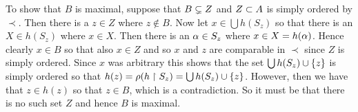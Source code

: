{{    To show that $B$ is maximal, suppose that $B \pss Z$ and $Z \ss A$ is simply ordered by $\prec$.
    Then there is a $z \in Z$ where $z \notin B$.
    Now let $x \in \bigcup h(S_z)$ so that there is an $X \in h(S_z)$ where $x \in X$.
    Then there is an $\a \in S_z$ where $x \in X = h(\a)$.
    Hence clearly $x \in B$ so that also $x \in Z$ and so $x$ and $z$ are comparable in $\prec$ since $Z$ is simply ordered.
    Since $x$ was arbitrary this shows that the set $\bigcup h(S_z) \cup \braces{z}$ is simply ordered so that $h(z) = \r(h \rest S_z) = \bigcup h(S_z) \cup \braces{z}$.
    However, then we have that $z \in h(z)$ so that $z \in B$, which is a contradiction.
    So it must be that there is no such set $Z$ and hence $B$ is maximal.
  } 
}

\renewcommand\thesubsection{\arabic{subsection}}
